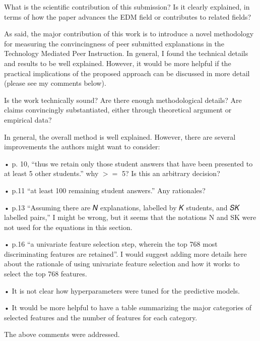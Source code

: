 \documentclass[notitlepage,12pt]{article}
\newcounter{answ}
\begin{document}
    \begin{revcomment}{What is the scientific contribution of this submission? Is it clearly explained, in terms of how the paper advances the EDM field or contributes to related fields?}

    As said, the major contribution of this work is to introduce a novel methodology for measuring the convincingness of peer submitted explanations in the Technology Mediated Peer Instruction. In general, I found the technical details and results to be well explained. However, it would be more helpful if the practical implications of the proposed approach can be discussed in more detail (please see my comments below).
    \end{revcomment}

    \begin{revcomment}{Is the work technically sound? Are there enough methodological details? Are claims convincingly substantiated, either through theoretical argument or empirical data?}

    In general, the overall method is well explained. However, there are several improvements the authors might want to consider:

    • p. 10, “thus we retain only those student answers that have been presented to at least 5 other students.” why $>=$ 5? Is this an arbitrary decision?

    • p.11 “at least 100 remaining student answers.” Any rationales?

    • p.13 “Assuming there are 𝑁 explanations, labelled by 𝐾 students, and 𝑆𝐾 labelled pairs,” I might be wrong, but it seems that the notations N and SK were not used for the equations in this section.

    • p.16 “a univariate feature selection step, wherein the top 768 most discriminating features are retained”. I would suggest adding more details here about the rationale of using univariate feature selection and how it works to select the top 768 features.

    • It is not clear how hyperparameters were tuned for the predictive models.

    • It would be more helpful to have a table summarizing the major categories of selected features and the number of features for each category. 

    \begin{authors}
      The above comments were addressed.
    \end{authors}

    \end{revcomment}
\end{document}

